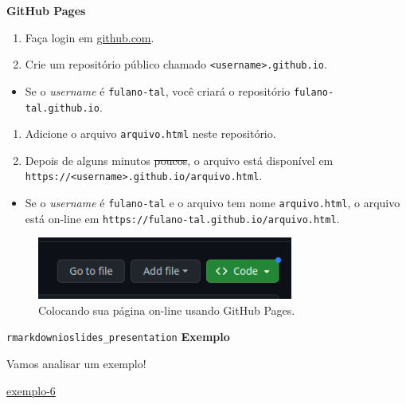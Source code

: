 \documentclass[
  10pt,
  ignorenonframetext,
]{beamer}
\providecommand{\tightlist}{%
  \setlength{\itemsep}{0pt}\setlength{\parskip}{0pt}}\usepackage{longtable,booktabs,array}
\begin{document}
\begin{frame}[fragile]
\textbf{GitHub Pages}

\begin{enumerate}
\tightlist
\item
  Faça login em \href{https://github.com/}{github.com}.
\item
  Crie um repositório público chamado
  \texttt{\textless{}username\textgreater{}.github.io}.
\end{enumerate}

\begin{itemize}
\tightlist
\item
  Se o \emph{username} é \texttt{fulano-tal}, você criará o repositório
  \texttt{fulano-tal.github.io}.
\end{itemize}

\begin{enumerate}
\tightlist
\item
  Adicione o arquivo \texttt{arquivo.html} neste repositório.
\item
  Depois de alguns minutos \st{poucos}, o arquivo está disponível em
  \texttt{https://\textless{}username\textgreater{}.github.io/arquivo.html}.
\end{enumerate}

\begin{itemize}
\tightlist
\item
  Se o \emph{username} é \texttt{fulano-tal} e o arquivo tem nome
  \texttt{arquivo.html}, o arquivo está on-line em
  \texttt{https://fulano-tal.github.io/arquivo.html}.
\end{itemize}

\begin{figure}

{\centering \includegraphics[width=0.75\textwidth,height=\textheight]{figuras/github-add-file.png}

}

\caption{Colocando sua página on-line usando GitHub Pages.}

\end{figure}
\end{frame}

\begin{frame}{\texttt{rmarkdown}\newline \texttt{ioslides\_presentation}}
\protect\hypertarget{rmarkdownioslides_presentation-12}{}
\textbf{Exemplo}

Vamos analisar um exemplo!

\href{https://ufbabr-my.sharepoint.com/:f:/g/personal/gilberto_sassi_ufba_br/EkgnO10OXN9EgwRNTWBlrz8BhxgoeoZzGwU9vyqHchTFwQ?e=kCV2k8}{exemplo-6}
\end{frame}
\end{document}
